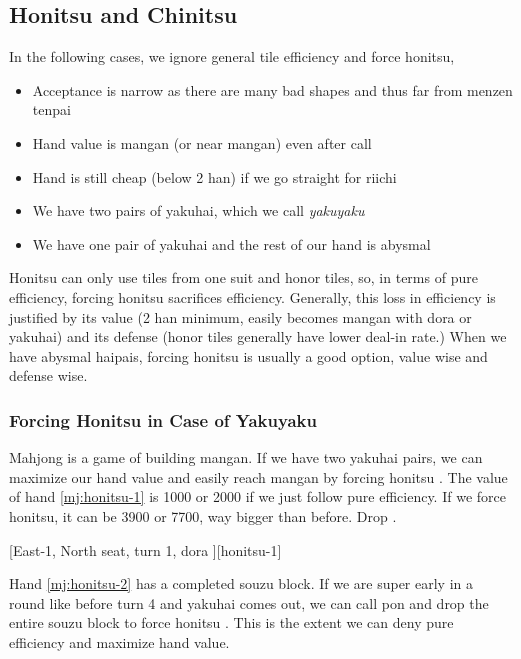 \documentclass[12pt]{article}
\begin{document}
\subsection{Honitsu and Chinitsu}

In the following cases, we ignore general tile efficiency and force honitsu,

\begin{itemize}
\item Acceptance is narrow as there are many bad shapes and thus far from menzen tenpai \citep{shibukawa-honitsu}
\item Hand value is mangan (or near mangan) even after call \citep{hirasawa-honitsu}
\item Hand is still cheap (below 2 han) if we go straight for riichi \citep{hirasawa-honitsu}
\item We have two pairs of yakuhai, which we call \textit{yakuyaku} \citep[][pp.~96--97]{zero-teyaku}
\item We have one pair of yakuhai and the rest of our hand is abysmal \citep[][pp.~97--98]{zero-teyaku}
\end{itemize}

Honitsu can only use tiles from one suit and honor tiles, so, in terms of pure efficiency, forcing honitsu sacrifices efficiency. Generally, this loss in efficiency is justified by its value (2 han minimum, easily becomes mangan with dora or yakuhai) and its defense (honor tiles generally have lower deal-in rate.) When we have abysmal haipais, forcing honitsu is usually a good option, value wise and defense wise.


\subsubsection*{Forcing Honitsu in Case of Yakuyaku}

Mahjong is a game of building mangan. If we have two yakuhai pairs, we can maximize our hand value and easily reach mangan by forcing honitsu \citep[][pp.~96--97]{zero-teyaku}. The value of hand \ref{mj:honitsu-1} is 1000 or 2000 if we just follow pure efficiency. If we force honitsu, it can be 3900 or 7700, way bigger than before. Drop .

[East-1, North seat, turn 1, dora ][honitsu-1]

Hand \ref{mj:honitsu-2} has a completed souzu block. If we are super early in a round like before turn 4 and yakuhai comes out, we can call pon and drop the entire souzu block to force honitsu \citep[][p.~97]{zero-teyaku}. This is the extent we can deny pure efficiency and maximize hand value.
\end{document}
